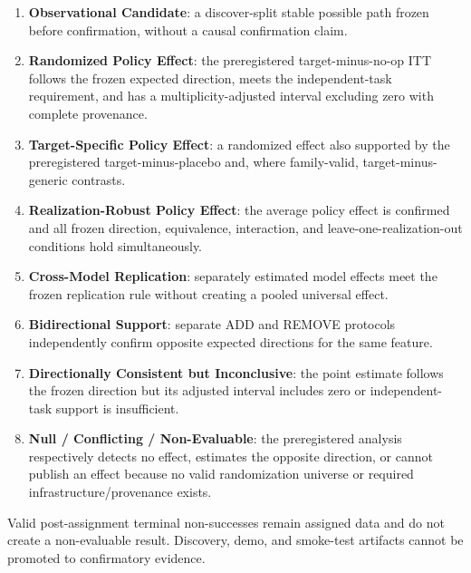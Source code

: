 \begin{enumerate}
  \item \textbf{Observational Candidate}: a discover-split stable possible path
  frozen before confirmation, without a causal confirmation claim.
  \item \textbf{Randomized Policy Effect}: the preregistered
  target-minus-no-op ITT follows the frozen expected direction, meets the
  independent-task requirement, and has a multiplicity-adjusted interval
  excluding zero with complete provenance.
  \item \textbf{Target-Specific Policy Effect}: a randomized effect also supported by
  the preregistered target-minus-placebo and, where family-valid,
  target-minus-generic contrasts.
  \item \textbf{Realization-Robust Policy Effect}: the average policy effect
  is confirmed and all frozen direction, equivalence, interaction, and
  leave-one-realization-out conditions hold simultaneously.
  \item \textbf{Cross-Model Replication}: separately estimated model effects
  meet the frozen replication rule without creating a pooled universal effect.
  \item \textbf{Bidirectional Support}: separate ADD and REMOVE protocols
  independently confirm opposite expected directions for the same feature.
  \item \textbf{Directionally Consistent but Inconclusive}: the point estimate
  follows the frozen direction but its adjusted interval includes zero or
  independent-task support is insufficient.
  \item \textbf{Null / Conflicting / Non-Evaluable}: the preregistered analysis
  respectively detects no effect, estimates the opposite direction, or cannot
  publish an effect because no valid randomization universe or required
  infrastructure/provenance exists.
\end{enumerate}

Valid post-assignment terminal non-successes remain assigned data and do not
create a non-evaluable result. Discovery, demo, and smoke-test artifacts cannot
be promoted to confirmatory evidence.
